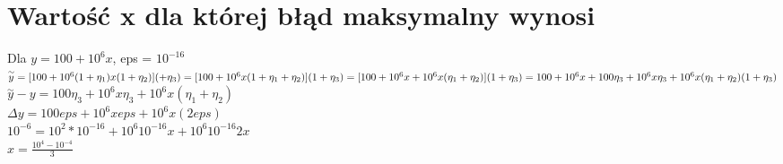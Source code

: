 \documentclass{article}
\begin{document}
\section{Wartość x dla której błąd maksymalny wynosi}
Dla $y=100+10^6x$, eps = $10^{-16}$\\
$\overset{\sim}{y}=[100+10^6(1+\eta_1)x(1+\eta_2)](+\eta_3)=[100+10^6x(1+\eta_1+\eta_2)](1+\eta_3)=[100+10^6x+10^6x(\eta_1+\eta_2)](1+\eta_3)=100+10^6x+100\eta_3+10^6x\eta_3+10^6x(\eta_1+\eta_2)(1+\eta_3)\\$
$\overset{\sim}{y}-y=100\eta_3+10^6x\eta_3+10^6x(\eta_1+\eta_2)$\\
$\Delta y=100eps+10^6xeps+10^6x(2eps)$\\
$10^{-6}=10^2*10^{-16}+10^6 10^{-16}x+10^6 10^{-16}2x$\\
$x=\frac{10^4-10^{-4}}{3}$

\end{document}
